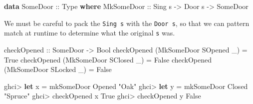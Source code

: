 \documentclass[]{article}
\newenvironment{Shaded}{}{}
\newcommand{\DataTypeTok}[1]{\textcolor[rgb]{0.56,0.13,0.00}{#1}}
\newcommand{\FunctionTok}[1]{\textcolor[rgb]{0.02,0.16,0.49}{#1}}
\newcommand{\KeywordTok}[1]{\textcolor[rgb]{0.00,0.44,0.13}{\textbf{#1}}}
\newcommand{\NormalTok}[1]{#1}
\newcommand{\OtherTok}[1]{\textcolor[rgb]{0.00,0.44,0.13}{#1}}
\newcommand{\StringTok}[1]{\textcolor[rgb]{0.25,0.44,0.63}{#1}}
\begin{document}
\begin{Shaded}
\begin{Highlighting}[]
\KeywordTok{data} \DataTypeTok{SomeDoor}\OtherTok{ ::} \DataTypeTok{Type} \KeywordTok{where}
    \DataTypeTok{MkSomeDoor}\OtherTok{ ::} \DataTypeTok{Sing}\NormalTok{ s }\OtherTok{->} \DataTypeTok{Door}\NormalTok{ s }\OtherTok{->} \DataTypeTok{SomeDoor}
\end{Highlighting}
\end{Shaded}

\begin{Shaded}
\end{Shaded}

We must be careful to pack the \texttt{Sing\ s} with the \texttt{Door\ s}, so
that we can pattern match at runtime to determine what the original \texttt{s}
was.

\begin{Shaded}
\begin{Highlighting}[]
\OtherTok{checkOpened ::} \DataTypeTok{SomeDoor} \OtherTok{->} \DataTypeTok{Bool}
\NormalTok{checkOpened (}\DataTypeTok{MkSomeDoor} \DataTypeTok{SOpened}\NormalTok{ _) }\FunctionTok{=} \DataTypeTok{True}
\NormalTok{checkOpened (}\DataTypeTok{MkSomeDoor} \DataTypeTok{SClosed}\NormalTok{ _) }\FunctionTok{=} \DataTypeTok{False}
\NormalTok{checkOpened (}\DataTypeTok{MkSomeDoor} \DataTypeTok{SLocked}\NormalTok{ _) }\FunctionTok{=} \DataTypeTok{False}
\end{Highlighting}
\end{Shaded}

\begin{Shaded}
\begin{Highlighting}[]
\NormalTok{ghci}\FunctionTok{>} \KeywordTok{let}\NormalTok{ x }\FunctionTok{=}\NormalTok{ mkSomeDoor }\DataTypeTok{Opened} \StringTok{"Oak"}
\NormalTok{ghci}\FunctionTok{>} \KeywordTok{let}\NormalTok{ y }\FunctionTok{=}\NormalTok{ mkSomeDoor }\DataTypeTok{Closed} \StringTok{"Spruce"}
\NormalTok{ghci}\FunctionTok{>}\NormalTok{ checkOpened x}
\DataTypeTok{True}
\NormalTok{ghci}\FunctionTok{>}\NormalTok{ checkOpened y}
\DataTypeTok{False}
\end{Highlighting}
\end{Shaded}
\end{document}
